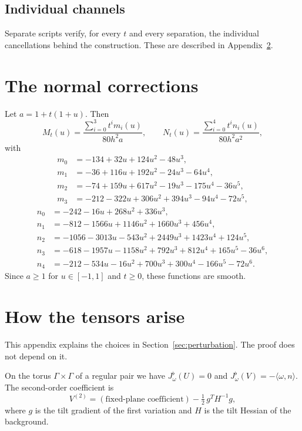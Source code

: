 \documentclass[11pt]{amsart}
\theoremstyle{definition}
\theoremstyle{remark}
\newcommand{\fl}{^{\flat}}
\begin{document}
\subsection*{Individual channels}
Separate scripts verify, for every $t$ and every separation, the individual cancellations behind the construction. These are described in Appendix~\ref{app:derivation}.

\appendix

\section{The normal corrections}\label{app:tables}

Let $a=1+t(1+u)$. Then
\[ M_t(u)=\frac{\sum_{i=0}^{3}t^i m_i(u)}{80h^2a},\qquad N_t(u)=\frac{\sum_{i=0}^{4}t^i n_i(u)}{80h^2a^2}, \]
with
\begin{align*}
m_0&=-134+32u+124u^2-48u^3,\\
m_1&=-36+116u+192u^2-24u^3-64u^4,\\
m_2&=-74+159u+617u^2-19u^3-175u^4-36u^5,\\
m_3&=-212-322u+306u^2+394u^3-94u^4-72u^5,
\end{align*}
\begin{align*}
n_0&=-242-16u+268u^2+336u^3,\\
n_1&=-812-1566u+1146u^2+1660u^3+456u^4,\\
n_2&=-1056-3013u-543u^2+2449u^3+1423u^4+124u^5,\\
n_3&=-618-1957u-1158u^2+792u^3+812u^4+165u^5-36u^6,\\
n_4&=-212-534u-16u^2+700u^3+300u^4-166u^5-72u^6.
\end{align*}
Since $a\ge1$ for $u\in[-1,1]$ and $t\ge0$, these functions are smooth.

\section{How the tensors arise}\label{app:derivation}

This appendix explains the choices in Section~\ref{sec:perturbation}. The proof does not depend on it.

On the torus $\Gamma\times\Gamma$ of a regular pair we have $J\fl_\omega(U)=0$ and $J\fl_\omega(V)=-\langle\omega,n\rangle$. The second-order coefficient is
\[ V^{(2)}=(\text{fixed-plane coefficient})-\tfrac12\,g^{T}H^{-1}g, \]
where $g$ is the tilt gradient of the first variation and $H$ is the tilt Hessian of the background.
\end{document}
